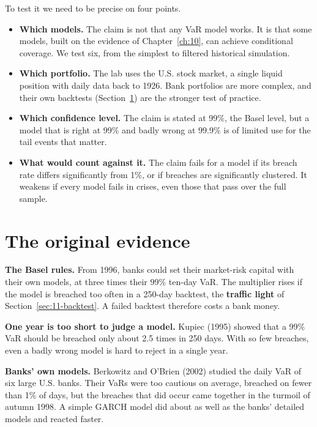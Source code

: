 To test it we need to be precise on four points.

\begin{itemize}
  \item \textbf{Which models.} The claim is not that any VaR model works. It is that some models, built on the evidence of Chapter~\ref{ch:10}, can achieve conditional coverage. We test six, from the simplest to filtered historical simulation.
  \item \textbf{Which portfolio.} The lab uses the U.S. stock market, a single liquid position with daily data back to 1926. Bank portfolios are more complex, and their own backtests (Section~\ref{sec:11-evidence}) are the stronger test of practice.
  \item \textbf{Which confidence level.} The claim is stated at 99\%, the Basel level, but a model that is right at 99\% and badly wrong at 99.9\% is of limited use for the tail events that matter.
  \item \textbf{What would count against it.} The claim fails for a model if its breach rate differs significantly from 1\%, or if breaches are significantly clustered. It weakens if every model fails in crises, even those that pass over the full sample.
\end{itemize}

\section{The original evidence}
\label{sec:11-evidence}

\textbf{The Basel rules.} From 1996, banks could set their market-risk capital with their own models, at three times their 99\% ten-day VaR. The multiplier rises if the model is breached too often in a 250-day backtest, the \textbf{traffic light} of Section~\ref{sec:11-backtest}. A failed backtest therefore costs a bank money.

\textbf{One year is too short to judge a model.} Kupiec (1995) showed that a 99\% VaR should be breached only about 2.5 times in 250 days. With so few breaches, even a badly wrong model is hard to reject in a single year.

\textbf{Banks' own models.} Berkowitz and O'Brien (2002) studied the daily VaR of six large U.S. banks. Their VaRs were too cautious on average, breached on fewer than 1\% of days, but the breaches that did occur came together in the turmoil of autumn 1998. A simple GARCH model did about as well as the banks' detailed models and reacted faster.

